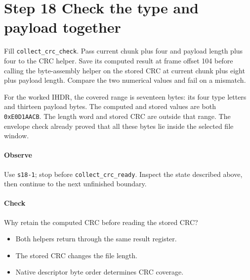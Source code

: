 \section{Step 18 Check the type and payload together}\label{png-collect-s18}
Fill \texttt{collect\_crc\_check}. Pass current chunk plus four and payload length plus four to the CRC helper. Save its computed result at frame offset 104 before calling the byte-assembly helper on the stored CRC at current chunk plus eight plus payload length. Compare the two numerical values and fail on a mismatch.

For the worked IHDR, the covered range is seventeen bytes: its four type letters and thirteen payload bytes. The computed and stored values are both \texttt{0xE0D1AACB}. The length word and stored CRC are outside that range. The envelope check already proved that all these bytes lie inside the selected file window.

\paragraph{Observe} Use \texttt{s18-1}; stop before \texttt{collect\_crc\_ready}. Inspect the state described above, then continue to the next unfinished boundary.

\paragraph{Check} Why retain the computed CRC before reading the stored CRC?
\begin{itemize}
  \item[A.] Both helpers return through the same result register.
  \item[B.] The stored CRC changes the file length.
  \item[C.] Native descriptor byte order determines CRC coverage.
\end{itemize}
